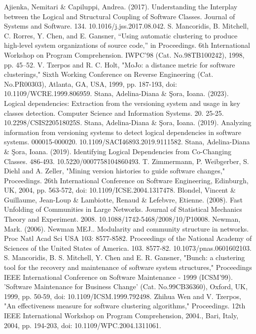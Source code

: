\documentclass{ieeeaccess}
\begin{document}
\begin{thebibliography}{00}

 Ajienka, Nemitari \& Capiluppi, Andrea. (2017). Understanding the Interplay between the Logical and Structural Coupling of Software Classes. Journal of Systems and Software. 134. 10.1016/j.jss.2017.08.042.
 S. Mancoridis, B. Mitchell, C. Rorres, Y. Chen, and E. Gansner, “Using automatic clustering to produce high-level system organizations of source code,” in Proceedings. 6th International Workshop on Program Comprehension. IWPC’98 (Cat. No.98TB100242), 1998, pp. 45–52.
 V. Tzerpos and R. C. Holt, "MoJo: a distance metric for software clusterings," Sixth Working Conference on Reverse Engineering (Cat. No.PR00303), Atlanta, GA, USA, 1999, pp. 187-193, doi: 10.1109/WCRE.1999.806959.
 Stana, Adelina-Diana \& Şora, Ioana. (2023). Logical dependencies: Extraction from the versioning system and usage in key classes detection. Computer Science and Information Systems. 20. 25-25. 10.2298/CSIS220518025S. 
 Stana, Adelina-Diana \& Şora, Ioana. (2019). Analyzing information from versioning systems to detect logical dependencies in software systems. 000015-000020. 10.1109/SACI46893.2019.9111582. 
 Stana, Adelina-Diana \& Şora, Ioana. (2019). Identifying Logical Dependencies from Co-Changing Classes. 486-493. 10.5220/0007758104860493. 
 T. Zimmermann, P. Weibgerber, S. Diehl and A. Zeller, "Mining version histories to guide software changes," Proceedings. 26th International Conference on Software Engineering, Edinburgh, UK, 2004, pp. 563-572, doi: 10.1109/ICSE.2004.1317478.
 Blondel, Vincent \& Guillaume, Jean-Loup \& Lambiotte, Renaud \& Lefebvre, Etienne. (2008). Fast Unfolding of Communities in Large Networks. Journal of Statistical Mechanics Theory and Experiment. 2008. 10.1088/1742-5468/2008/10/P10008. 
 Newman, Mark. (2006). Newman MEJ.. Modularity and community structure in networks. Proc Natl Acad Sci USA 103: 8577-8582. Proceedings of the National Academy of Sciences of the United States of America. 103. 8577-82. 10.1073/pnas.0601602103. 
 S. Mancoridis, B. S. Mitchell, Y. Chen and E. R. Gansner, "Bunch: a clustering tool for the recovery and maintenance of software system structures," Proceedings IEEE International Conference on Software Maintenance - 1999 (ICSM'99). 'Software Maintenance for Business Change' (Cat. No.99CB36360), Oxford, UK, 1999, pp. 50-59, doi: 10.1109/ICSM.1999.792498.
 Zhihua Wen and V. Tzerpos, "An effectiveness measure for software clustering algorithms," Proceedings. 12th IEEE International Workshop on Program Comprehension, 2004., Bari, Italy, 2004, pp. 194-203, doi: 10.1109/WPC.2004.1311061.

\end{thebibliography}
\end{document}

